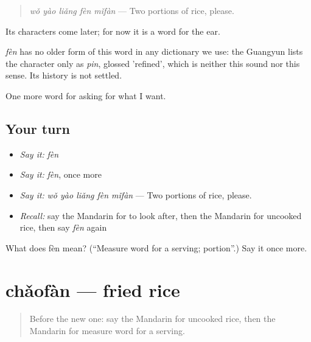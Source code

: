 \begin{quote}
\emph{wǒ yào liǎng fèn mǐfàn} — Two portions of rice, please.
\end{quote}

Its characters come later; for now it is a word for the ear.

\begin{cousinweb}
\emph{fèn} has no older form of this word in any dictionary we use: the Guangyun lists the character only as \emph{pin}, glossed 'refined', which is neither this sound nor this sense. Its history is not settled.
\end{cousinweb}

\begin{grammarlens}[title={What you've built}]
One more word for asking for what I want.
\end{grammarlens}

\subsection*{Your turn}
\begin{itemize}
\raggedright
  \item \emph{Say it:} \emph{fèn}
  \item \emph{Say it:} \emph{fèn}, once more
  \item \emph{Say it:} \emph{wǒ yào liǎng fèn mǐfàn} — Two portions of rice, please.
  \item \emph{Recall:} say the Mandarin for to look after, then the Mandarin for uncooked rice, then say \emph{fèn} again
\end{itemize}

\begin{tcolorbox}[breakable,colback=teal!4,colframe=teal!35!black,title={Before you move on}]
What does fèn mean? (\textquotedblleft{}Measure word for a serving; portion\textquotedblright{}.) Say it once more.
\end{tcolorbox}
\section[chǎofàn]{chǎofàn — fried rice}

\label{lesson:ZH-C161-chaofan}



\begin{quote}
Before the new one: say the Mandarin for uncooked rice, then the Mandarin for measure word for a serving.
\end{quote}

